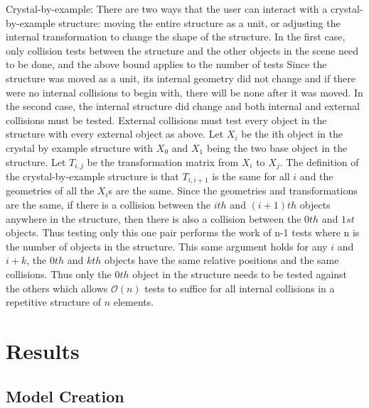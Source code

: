 \documentclass{article} %
\begin{document}
Crystal-by-example:
There are two ways that the user can interact with a crystal-by-example structure: moving the entire structure as a unit, or adjusting the internal transformation to change the shape of the structure.  In the first case, only collision tests between the structure and the other objects in the scene need to be done, and the above bound applies to the number of tests  Since the structure was moved as a unit, its internal geometry did not change and if there were no internal collisions to begin with, there will be none after it was moved.  In the second case, the internal structure did change and both internal and external collisions must be tested.  External collisions must test every object in the structure with every external object as above.  Let $X_i$ be the ith object in the crystal by example structure with $X_0$ and $X_1$ being the two base object in the structure.  Let $T_{i,j}$ be the transformation matrix from $X_i$ to $X_j$.  The definition of the crystal-by-example structure is that $T_{i,i+1}$ is the same for all $i$ and the geometries of all the $X_i$s are the same.  Since the geometries and transformations are the same, if there is a collision between the $ith$ and $(i+1)th$ objects anywhere in the structure, then there is also a collision between the $0th$ and $1st$ objects.  Thus testing only this one pair performs the work of n-1 tests where n is the number of objects in the structure.  This same argument holds for any $i$ and $i+k$, the $0th$ and $kth$ objects have the same relative positions and the same collisions.  Thus only the $0th$ object in the structure needs to be tested against the others which allows $\mathcal{O}(n)$ tests to suffice for all internal collisions in a repetitive structure of $n$ elements.

\section{Results}
\subsection{Model Creation}
\end{document}
